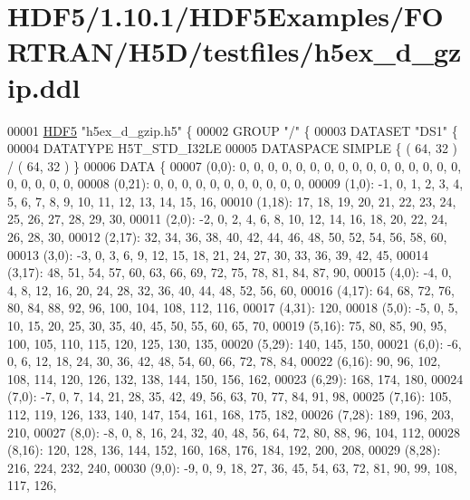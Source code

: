 \hypertarget{_h_d_f5_21_810_81_2_h_d_f5_examples_2_f_o_r_t_r_a_n_2_h5_d_2testfiles_2h5ex__d__gzip_8ddl_source}{}\section{H\+D\+F5/1.10.1/\+H\+D\+F5\+Examples/\+F\+O\+R\+T\+R\+A\+N/\+H5\+D/testfiles/h5ex\+\_\+d\+\_\+gzip.ddl}
\label{_h_d_f5_21_810_81_2_h_d_f5_examples_2_f_o_r_t_r_a_n_2_h5_d_2testfiles_2h5ex__d__gzip_8ddl_source}

\begin{DoxyCode}
00001 \hyperlink{namespace_h_d_f5}{HDF5} \textcolor{stringliteral}{"h5ex\_d\_gzip.h5"} \{
00002 GROUP \textcolor{stringliteral}{"/"} \{
00003    DATASET \textcolor{stringliteral}{"DS1"} \{
00004       DATATYPE  H5T\_STD\_I32LE
00005       DATASPACE  SIMPLE \{ ( 64, 32 ) / ( 64, 32 ) \}
00006       DATA \{
00007       (0,0): 0, 0, 0, 0, 0, 0, 0, 0, 0, 0, 0, 0, 0, 0, 0, 0, 0, 0, 0, 0, 0,
00008       (0,21): 0, 0, 0, 0, 0, 0, 0, 0, 0, 0, 0,
00009       (1,0): -1, 0, 1, 2, 3, 4, 5, 6, 7, 8, 9, 10, 11, 12, 13, 14, 15, 16,
00010       (1,18): 17, 18, 19, 20, 21, 22, 23, 24, 25, 26, 27, 28, 29, 30,
00011       (2,0): -2, 0, 2, 4, 6, 8, 10, 12, 14, 16, 18, 20, 22, 24, 26, 28, 30,
00012       (2,17): 32, 34, 36, 38, 40, 42, 44, 46, 48, 50, 52, 54, 56, 58, 60,
00013       (3,0): -3, 0, 3, 6, 9, 12, 15, 18, 21, 24, 27, 30, 33, 36, 39, 42, 45,
00014       (3,17): 48, 51, 54, 57, 60, 63, 66, 69, 72, 75, 78, 81, 84, 87, 90,
00015       (4,0): -4, 0, 4, 8, 12, 16, 20, 24, 28, 32, 36, 40, 44, 48, 52, 56, 60,
00016       (4,17): 64, 68, 72, 76, 80, 84, 88, 92, 96, 100, 104, 108, 112, 116,
00017       (4,31): 120,
00018       (5,0): -5, 0, 5, 10, 15, 20, 25, 30, 35, 40, 45, 50, 55, 60, 65, 70,
00019       (5,16): 75, 80, 85, 90, 95, 100, 105, 110, 115, 120, 125, 130, 135,
00020       (5,29): 140, 145, 150,
00021       (6,0): -6, 0, 6, 12, 18, 24, 30, 36, 42, 48, 54, 60, 66, 72, 78, 84,
00022       (6,16): 90, 96, 102, 108, 114, 120, 126, 132, 138, 144, 150, 156, 162,
00023       (6,29): 168, 174, 180,
00024       (7,0): -7, 0, 7, 14, 21, 28, 35, 42, 49, 56, 63, 70, 77, 84, 91, 98,
00025       (7,16): 105, 112, 119, 126, 133, 140, 147, 154, 161, 168, 175, 182,
00026       (7,28): 189, 196, 203, 210,
00027       (8,0): -8, 0, 8, 16, 24, 32, 40, 48, 56, 64, 72, 80, 88, 96, 104, 112,
00028       (8,16): 120, 128, 136, 144, 152, 160, 168, 176, 184, 192, 200, 208,
00029       (8,28): 216, 224, 232, 240,
00030       (9,0): -9, 0, 9, 18, 27, 36, 45, 54, 63, 72, 81, 90, 99, 108, 117, 126,

\end{DoxyCode}
